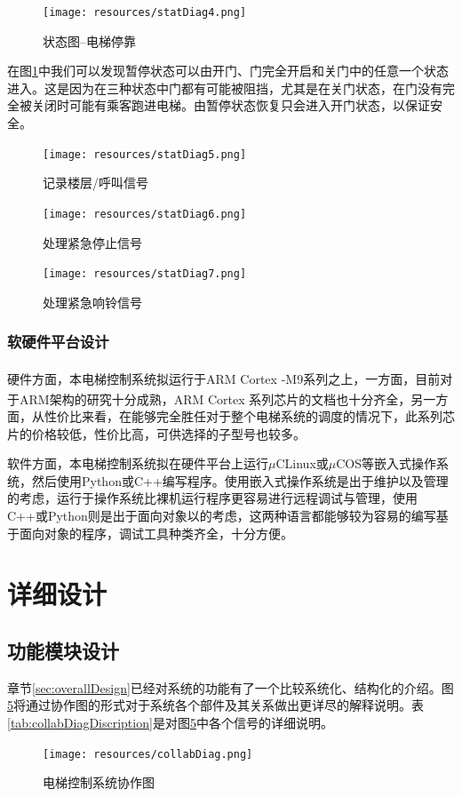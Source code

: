 \begin{figure}[H]
	\centering
	\texttt{[image: resources/statDiag4.png]}
	\caption{状态图--电梯停靠}
	\label{fig:statDiag4}
\end{figure}
在图\ref{fig:statDiag4}中我们可以发现暂停状态可以由开门、门完全开启和关门中的任意一个状态进入。这是因为在三种状态中门都有可能被阻挡，尤其是在关门状态，在门没有完全被关闭时可能有乘客跑进电梯。由暂停状态恢复只会进入开门状态，以保证安全。

\begin{figure}[H]
	\centering
	\texttt{[image: resources/statDiag5.png]}
	\caption{记录楼层/呼叫信号}
	\label{fig:statDiag5}
\end{figure}

\begin{figure}[H]
	\centering
	\texttt{[image: resources/statDiag6.png]}
	\caption{处理紧急停止信号}
	\label{fig:resources/statDiag6}
\end{figure}

\begin{figure}[H]
	\centering
	\texttt{[image: resources/statDiag7.png]}
	\caption{处理紧急响铃信号}
	\label{fig:statDiag7}
\end{figure}

\subsubsection{软硬件平台设计}
硬件方面，本电梯控制系统拟运行于ARM\textsuperscript{\textregistered} Cortex\textsuperscript{\textregistered} -M9系列之上，一方面，目前对于ARM架构的研究十分成熟，ARM\textsuperscript{\textregistered} Cortex\textsuperscript{\textregistered} 系列芯片的文档也十分齐全，另一方面，从性价比来看，在能够完全胜任对于整个电梯系统的调度的情况下，此系列芯片的价格较低，性价比高，可供选择的子型号也较多。\par

软件方面，本电梯控制系统拟在硬件平台上运行$\mu$CLinux或$\mu$COS等嵌入式操作系统，然后使用Python或C++编写程序。使用嵌入式操作系统是出于维护以及管理的考虑，运行于操作系统比裸机运行程序更容易进行远程调试与管理，使用C++或Python则是出于面向对象以的考虑，这两种语言都能够较为容易的编写基于面向对象的程序，调试工具种类齐全，十分方便。

\newpage
\section{详细设计}
\label{sec:detailDesign}
\subsection{功能模块设计}
章节\ref{sec:overallDesign}已经对系统的功能有了一个比较系统化、结构化的介绍。图\ref{fig:collabDiag}将通过协作图的形式对于系统各个部件及其关系做出更详尽的解释说明。表\ref{tab:collabDiagDiscription}是对图\ref{fig:collabDiag}中各个信号的详细说明。
\begin{figure}[H]
	\centering
	\texttt{[image: resources/collabDiag.png]}
	\caption{电梯控制系统协作图}
	\label{fig:collabDiag}
\end{figure}

